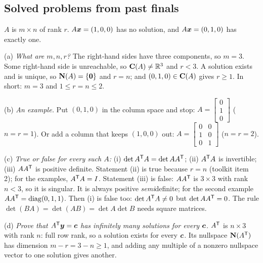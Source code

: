 \subsection{Solved problems from past finals}

\begin{example}\label{ex:u39-rank}
$A$ is $m\times n$ of rank $r$. $A\boldsymbol{x}=(1,0,0)$ has no solution, and $A\boldsymbol{x}=(0,1,0)$ has exactly one.

(a) \emph{What are $m,n,r$?} The right-hand sides have three components, so $m=3$. Some right-hand side is unreachable, so $\mathbf{C}(A)\neq\mathbb{R}^{3}$ and $r<3$. A solution exists and is unique, so $\mathbf{N}(A)=\{\boldsymbol{0}\}$ and $r=n$; and $(0,1,0)\in\mathbf{C}(A)$ gives $r\ge1$. In short: $m=3$ and $1\le r=n\le2$.

(b) \emph{An example.} Put $(0,1,0)$ in the column space and stop: $A=\begin{bmatrix}0\\1\\0\end{bmatrix}$ ($n=r=1$). Or add a column that keeps $(1,0,0)$ out: $A=\begin{bmatrix}0&0\\1&0\\0&1\end{bmatrix}$ ($n=r=2$).

(c) \emph{True or false for every such $A$:} (i) $\det A^{\mathsf{T}} A=\det AA^{\mathsf{T}}$; (ii) $A^{\mathsf{T}} A$ is invertible; (iii) $AA^{\mathsf{T}}$ is positive definite. Statement (ii) is true because $r=n$ (toolkit item 2); for the examples, $A^{\mathsf{T}} A=I$. Statement (iii) is false: $AA^{\mathsf{T}}$ is $3\times3$ with rank $n<3$, so it is singular. It is always positive \emph{semi}definite; for the second example $AA^{\mathsf{T}}=\operatorname{diag}(0,1,1)$. Then (i) is false too: $\det A^{\mathsf{T}} A\neq0$ but $\det AA^{\mathsf{T}}=0$. The rule $\det(BA)=\det(AB)=\det A\det B$ needs square matrices.

(d) \emph{Prove that $A^{\mathsf{T}}\boldsymbol{y}=\boldsymbol{c}$ has infinitely many solutions for every $\boldsymbol{c}$.} $A^{\mathsf{T}}$ is $n\times3$ with rank $n$: full row rank, so a solution exists for every $\boldsymbol{c}$. Its nullspace $\mathbf{N}(A^{\mathsf{T}})$ has dimension $m-r=3-n\ge1$, and adding any multiple of a nonzero nullspace vector to one solution gives another.
\end{example}

